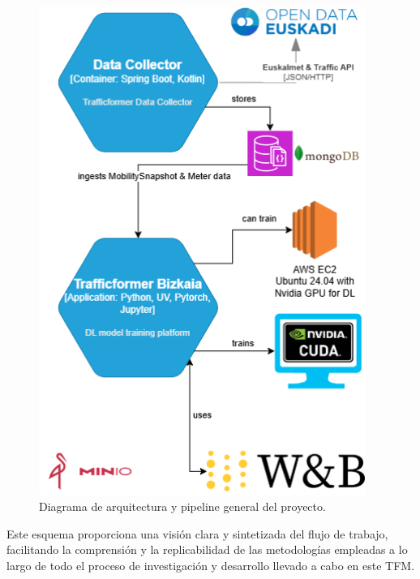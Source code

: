\begin{figure}[H]
	\centering
	\includegraphics[width=0.95\textwidth]{includes/cap4/trafficformer_arch.png}
	\caption{Diagrama de arquitectura y pipeline general del proyecto.}
	\label{fig:pipeline-general}
\end{figure}

Este esquema proporciona una visión clara y sintetizada del flujo de trabajo, facilitando la comprensión y la replicabilidad de las metodologías empleadas a lo largo de todo el proceso de investigación y desarrollo llevado a cabo en este TFM.


